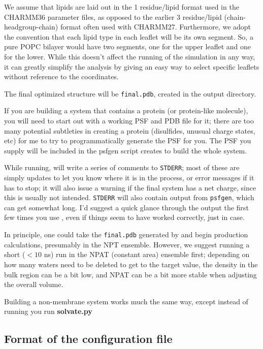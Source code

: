 \documentclass[12pt]{article}
\begin{document}
We assume that lipids are laid out in the 1 residue/lipid format
used in the CHARMM36 parameter files, as opposed to the earlier 3
residue/lipid (chain-headgroup-chain) format often used with CHARMM27.
Furthermore, we adopt the convention that each lipid type in each leaflet
will be its own segment.  So, a pure POPC bilayer would have two segments,
one for the upper leaflet and one for the lower.  While this doesn't affect
the running of the simulation in any way, it can greatly simplify the
analysis by giving an easy way to select specific leaflets without reference
to the coordinates.

The final optimized structure will be {\tt final.pdb}, created in the output
directory.

If you are building a system that contains a protein (or protein-like
molecule), you will need to start out with a working PSF and PDB file for
it; there are too many potential subtleties in creating a protein
(disulfides, unusual charge states, etc) for me to try to programmatically
generate the PSF for you.  The PSF you supply will be included in the
psfgen script {\omgwtf} creates to build the whole system.

While running, {\omgwtf} will write a series of comments to {\tt STDERR};
most of these are simply updates to let you know where it is in the
process, or error messages if it has to stop; it will also issue a warning
if the final system has a net charge, since this is usually not intended.
{\tt STDERR} will also contain output from {\tt psfgen}, which can get
somewhat long.  I'd suggest a quick glance through the output the first few
times you use {\omgwtf}, even if things seem to have worked correctly, just
in case.

In principle, one could take the {\tt final.pdb} generated by {\omgwtf} and
begin production calculations, presumably in the NPT ensemble.  However, we
suggest running a short ($<10$ ns) run in the NPAT (constant area) ensemble
first; depending on how many waters need to be deleted to get to the target
value, the density in the bulk region can be a bit low, and NPAT can be a
bit more stable when adjusting the overall volume.

Building a non-membrane system works much the same way, except instead of running {\omgwtf} you run {\bf solvate.py}

\subsection{Format of the configuration file}
\label{ss:config}
\end{document}
